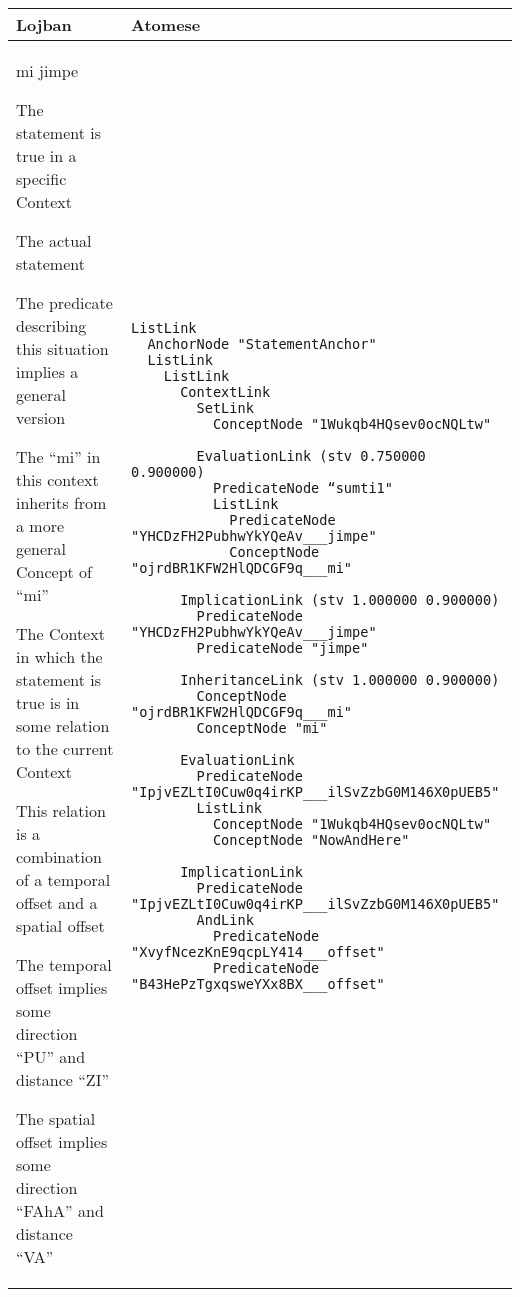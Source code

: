 \begin{center}
    \begin{tabular}{| p{7cm} | p{7cm} |}
        \hline
        Lojban & Atomese \\
        \hline
        \begin{center}
mi jimpe




The statement is true in a specific Context



The actual statement


The predicate describing this situation implies a general version

The “mi” in this context inherits from a more general Concept of “mi”

The Context in which the statement is true is in some relation to the current Context

This relation is a combination of a temporal offset
and a spatial offset



The temporal offset implies some direction “PU” and distance “ZI”



The spatial offset implies some direction “FAhA” and distance “VA”
        \end{center}
        &
        \begin{lstlisting}
ListLink
  AnchorNode "StatementAnchor"
  ListLink
    ListLink
      ContextLink
        SetLink
          ConceptNode "1Wukqb4HQsev0ocNQLtw"

        EvaluationLink (stv 0.750000 0.900000)
          PredicateNode “sumti1"
          ListLink
            PredicateNode "YHCDzFH2PubhwYkYQeAv___jimpe"
            ConceptNode "ojrdBR1KFW2HlQDCGF9q___mi"

      ImplicationLink (stv 1.000000 0.900000)
        PredicateNode "YHCDzFH2PubhwYkYQeAv___jimpe"
        PredicateNode "jimpe"

      InheritanceLink (stv 1.000000 0.900000)
        ConceptNode "ojrdBR1KFW2HlQDCGF9q___mi"
        ConceptNode "mi"

      EvaluationLink
        PredicateNode "IpjvEZLtI0Cuw0q4irKP___ilSvZzbG0M146X0pUEB5"
        ListLink
          ConceptNode "1Wukqb4HQsev0ocNQLtw"
          ConceptNode "NowAndHere"

      ImplicationLink
        PredicateNode "IpjvEZLtI0Cuw0q4irKP___ilSvZzbG0M146X0pUEB5"
        AndLink
          PredicateNode "XvyfNcezKnE9qcpLY414___offset"
          PredicateNode "B43HePzTgxqsweYXx8BX___offset"


\end{lstlisting}
\end{tabular}
\end{center}
